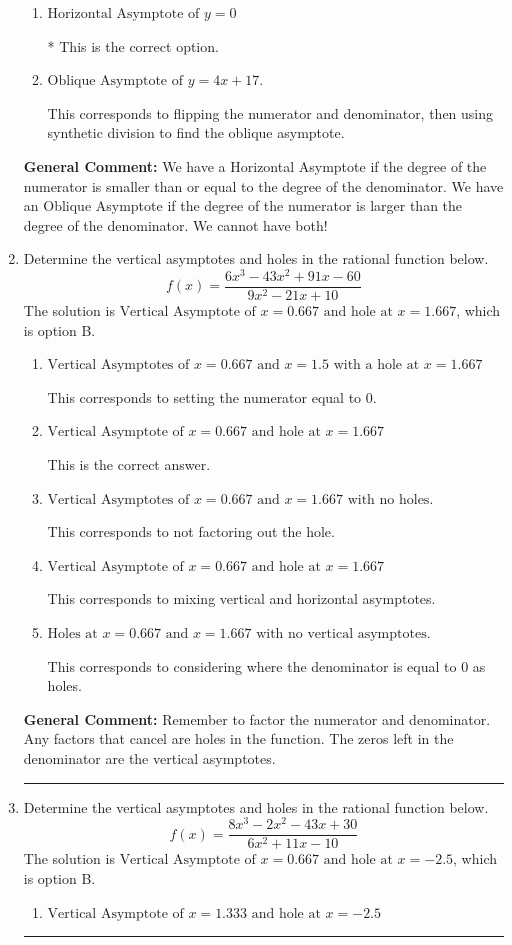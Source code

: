 \documentclass{extbook}[14pt]
\newcommand{\litem}[1]{\item #1

\rule{\textwidth}{0.4pt}}
\begin{document}
\begin{enumerate}
{\begin{enumerate}[label=\Alph*.]
This corresponds to believing there can be both a horizontal and oblique asymptote.
\item \( \text{Horizontal Asymptote of } y = 0 \)

* This is the correct option.
\item \( \text{Oblique Asymptote of } y = 4x + 17. \)

This corresponds to flipping the numerator and denominator, then using synthetic division to find the oblique asymptote.
\end{enumerate}

\textbf{General Comment:} We have a Horizontal Asymptote if the degree of the numerator is smaller than or equal to the degree of the denominator. We have an Oblique Asymptote if the degree of the numerator is larger than the degree of the denominator. We cannot have both!
}
\litem{
Determine the vertical asymptotes and holes in the rational function below.
\[ f(x) = \frac{6x^{3} -43 x^{2} +91 x -60}{9x^{2} -21 x + 10} \]The solution is \( \text{Vertical Asymptote of } x = 0.667 \text{ and hole at } x = 1.667 \), which is option B.\begin{enumerate}[label=\Alph*.]
\item \( \text{Vertical Asymptotes of } x = 0.667 \text{ and } x = 1.5 \text{ with a hole at } x = 1.667 \)

This corresponds to setting the numerator equal to 0.
\item \( \text{Vertical Asymptote of } x = 0.667 \text{ and hole at } x = 1.667 \)

This is the correct answer.
\item \( \text{Vertical Asymptotes of } x = 0.667 \text{ and } x = 1.667 \text{ with no holes.} \)

This corresponds to not factoring out the hole.
\item \( \text{Vertical Asymptote of } x = 0.667 \text{ and hole at } x = 1.667 \)

This corresponds to mixing vertical and horizontal asymptotes.
\item \( \text{Holes at } x = 0.667 \text{ and } x = 1.667 \text{ with no vertical asymptotes.} \)

This corresponds to considering where the denominator is equal to 0 as holes.
\end{enumerate}

\textbf{General Comment:} Remember to factor the numerator and denominator. Any factors that cancel are holes in the function. The zeros left in the denominator are the vertical asymptotes.
}
\litem{
Determine the vertical asymptotes and holes in the rational function below.
\[ f(x) = \frac{8x^{3} -2 x^{2} -43 x + 30}{6x^{2} +11 x -10} \]The solution is \( \text{Vertical Asymptote of } x = 0.667 \text{ and hole at } x = -2.5 \), which is option B.\begin{enumerate}[label=\Alph*.]
\item \( \text{Vertical Asymptote of } x = 1.333 \text{ and hole at } x = -2.5 \)


\end{enumerate}}
\end{enumerate}
\end{document}
